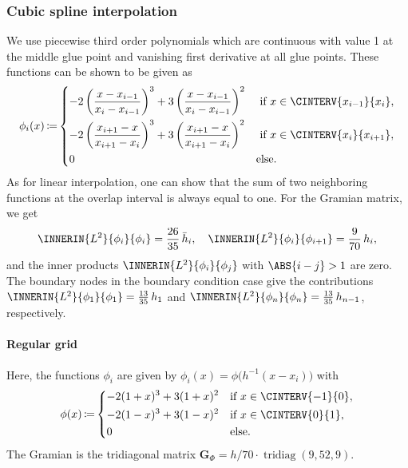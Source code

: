 \documentclass[a4paper]{paper}
\DeclareMathOperator{\TRIDIAG}{{tridiag}}
\DeclareMathOperator{\DEFEQ}{{\coloneqq}}
\newcommand*{\BDG}{\boldsymbol{G}}
\begin{document}
\subsubsection{Cubic spline interpolation}
\label{subsubsec:specif:interp:cubic}

We use piecewise third order polynomials which are continuous with value 1 at the middle glue point and vanishing first 
derivative at all glue points. These functions can be shown to be given as
%
\begin{equation*}
 \phi_i(x) \DEFEQ
 \begin{dcases}
  -2\left( \frac{x - x_{i-1}}{x_i - x_{i-1}} \right)^3 + 
  3 \left( \frac{x - x_{i-1}}{x_i - x_{i-1}} \right)^2 & \text{ if }
  x \in \CINTERV{x_{i-1}}{x_i}, \\
  -2\left( \frac{x_{i+1} - x}{x_{i+1} - x_i} \right)^3 + 
  3 \left( \frac{x_{i+1} - x}{x_{i+1} - x_i} \right)^2 & \text{ if } 
  x \in \CINTERV{x_i}{x_{i+1}}, \\
  0 & \text{else}.
 \end{dcases}
\end{equation*}
%
As for linear interpolation, one can show that the sum of two neighboring functions at the overlap interval is always 
equal to one. For the Gramian matrix, we get
%
\begin{equation*}
 \INNERIN{L^2}{\phi_i}{\phi_i} = \frac{26}{35}\, \bar h_i, 
 \quad
 \INNERIN{L^2}{\phi_i}{\phi_{i+1}} = \frac{9}{70}\, h_i,
\end{equation*}
%
and the inner products $\INNERIN{L^2}{\phi_i}{\phi_j}$ with $\ABS{i-j} > 1$ are zero. The boundary nodes in the 
boundary condition case give the contributions $\INNERIN{L^2}{\phi_1}{\phi_1} = \frac{13}{35}\, h_1$ and
$\INNERIN{L^2}{\phi_n}{\phi_n} = \frac{13}{35}\, h_{n-1}$, respectively.

\paragraph{Regular grid}

Here, the functions $\phi_i$ are given by $\phi_i(x) = \phi\big( h^{-1}(x-x_i) \big)$ with
%
\begin{equation*}
 \phi(x) \DEFEQ
 \begin{dcases}
  -2(1+x)^3 + 3(1+x)^2 & \text{if } x \in \CINTERV{-1}{0}, \\
  -2(1-x)^3 + 3(1-x)^2 & \text{if } x \in \CINTERV{0}{1}, \\
  0 & \text{else}.
 \end{dcases}
\end{equation*}
%
The Gramian is the tridiagonal matrix $\BDG_\Phi = h/70\cdot\TRIDIAG(9, 52, 9)$.
\end{document}

